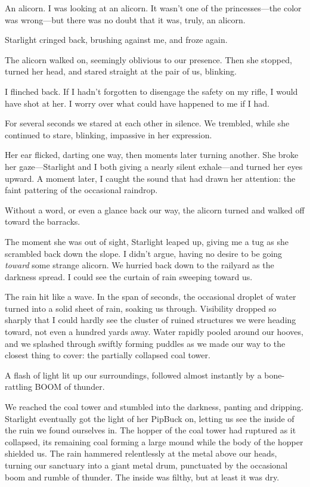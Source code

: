 An alicorn. I was looking at an alicorn. It wasn’t one of the princesses—the color was wrong—but there was no doubt that it was, truly, an alicorn.

Starlight cringed back, brushing against me, and froze again.

The alicorn walked on, seemingly oblivious to our presence. Then she stopped, turned her head, and stared straight at the pair of us, blinking.

I flinched back. If I hadn’t forgotten to disengage the safety on my rifle, I would have shot at her. I worry over what could have happened to me if I had.

For several seconds we stared at each other in silence. We trembled, while she continued to stare, blinking, impassive in her expression.

Her ear flicked, darting one way, then moments later turning another. She broke her gaze—Starlight and I both giving a nearly silent exhale—and turned her eyes upward. A moment later, I caught the sound that had drawn her attention: the faint pattering of the occasional raindrop.

Without a word, or even a glance back our way, the alicorn turned and walked off toward the barracks.

The moment she was out of sight, Starlight leaped up, giving me a tug as she scrambled back down the slope. I didn’t argue, having no desire to be going \textit{toward} some strange alicorn. We hurried back down to the railyard as the darkness spread. I could see the curtain of rain sweeping toward us.

The rain hit like a wave. In the span of seconds, the occasional droplet of water turned into a solid sheet of rain, soaking us through. Visibility dropped so sharply that I could hardly see the cluster of ruined structures we were heading toward, not even a hundred yards away. Water rapidly pooled around our hooves, and we splashed through swiftly forming puddles as we made our way to the closest thing to cover: the partially collapsed coal tower.

A flash of light lit up our surroundings, followed almost instantly by a bone-rattling BOOM of thunder.

We reached the coal tower and stumbled into the darkness, panting and dripping. Starlight eventually got the light of her PipBuck on, letting us see the inside of the ruin we found ourselves in. The hopper of the coal tower had ruptured as it collapsed, its remaining coal forming a large mound while the body of the hopper shielded us. The rain hammered relentlessly at the metal above our heads, turning our sanctuary into a giant metal drum, punctuated by the occasional boom and rumble of thunder. The inside was filthy, but at least it was dry.

